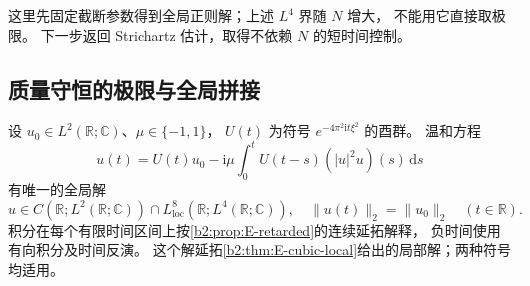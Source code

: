 这里先固定截断参数得到全局正则解；上述 \(L^4\) 界随 \(N\) 增大，
不能用它直接取极限。
下一步返回 Strichartz 估计，取得不依赖 \(N\) 的短时间控制。

\subsection{质量守恒的极限与全局拼接}
\label{b2:subsec:E-cubic-global}

\begin{theorem}[一维三次模型的质量守恒与全局延拓]
\label{b2:thm:E-cubic-global}
设 \(u_0\in L^2(\mathbb R;\mathbb C)\)、\(\mu\in\{-1,1\}\)，
\(U(t)\) 为符号 \(e^{-4\pi^2\mathrm it\xi^2}\) 的酉群。
温和方程
\[
 u(t)=U(t)u_0-\mathrm i\mu\int_0^tU(t-s)(|u|^2u)(s)\,\mathrm ds
\]
有唯一的全局解
\[
 u\in C(\mathbb R;L^2(\mathbb R;\mathbb C))
       \cap L^8_{\mathrm{loc}}(\mathbb R;L^4(\mathbb R;\mathbb C)),
 \quad \|u(t)\|_2=\|u_0\|_2\quad(t\in\mathbb R).
\]
积分在每个有限时间区间上按\cref{b2:prop:E-retarded}的连续延拓解释，
负时间使用有向积分及时间反演。
这个解延拓\cref{b2:thm:E-cubic-local}给出的局部解；两种符号均适用。
\end{theorem}
